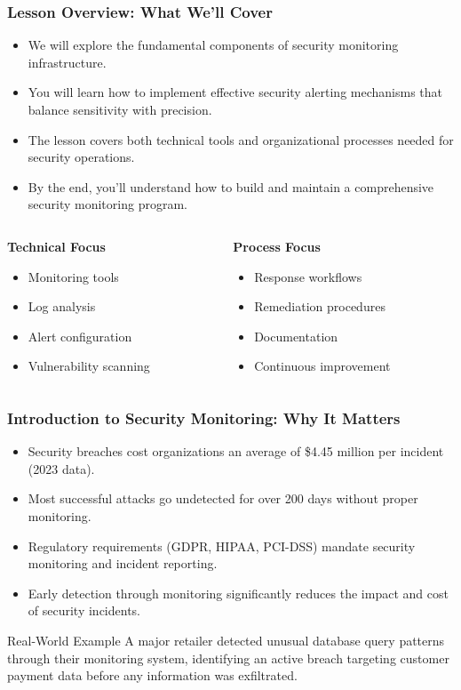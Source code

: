 \documentclass{beamer}
\begin{document}
\begin{frame}
\frametitle{Lesson Overview: What We'll Cover}
\begin{itemize}
\item We will explore the fundamental components of security monitoring infrastructure.
\item You will learn how to implement effective security alerting mechanisms that balance sensitivity with precision.
\item The lesson covers both technical tools and organizational processes needed for security operations.
\item By the end, you'll understand how to build and maintain a comprehensive security monitoring program.
\end{itemize}

\begin{columns}[T]
\begin{column}{0.5\textwidth}
\textbf{Technical Focus}
\begin{itemize}
\item Monitoring tools
\item Log analysis
\item Alert configuration
\item Vulnerability scanning
\end{itemize}
\end{column}
\begin{column}{0.5\textwidth}
\textbf{Process Focus}
\begin{itemize}
\item Response workflows
\item Remediation procedures
\item Documentation
\item Continuous improvement
\end{itemize}
\end{column}
\end{columns}
\end{frame}

\begin{frame}
\frametitle{Introduction to Security Monitoring: Why It Matters}
\begin{itemize}
\item Security breaches cost organizations an average of \$4.45 million per incident (2023 data).
\item Most successful attacks go undetected for over 200 days without proper monitoring.
\item Regulatory requirements (GDPR, HIPAA, PCI-DSS) mandate security monitoring and incident reporting.
\item Early detection through monitoring significantly reduces the impact and cost of security incidents.
\end{itemize}

\begin{exampleblock}{Real-World Example}
A major retailer detected unusual database query patterns through their monitoring system, identifying an active breach targeting customer payment data before any information was exfiltrated.
\end{exampleblock}
\end{frame}
\end{document}
